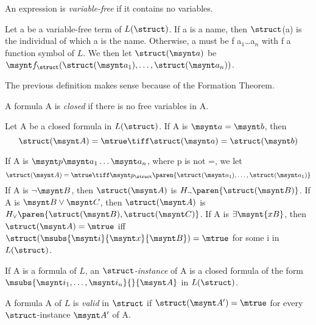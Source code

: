 \begin{definition}
	An expression is \emph{variable-free} if it contains no variables.
\end{definition}

\begin{definition}
	Let \synt a be a variable-free term of $L(\struct)$. If \synt a is a name, then
	$\struct$(\synt a) is the individual of which \synt a is the name. Otherwise,
	\synt a must be \synt f \synt a$_1$\dots\synt a$_n$ with \synt f a function
	symbol of $L$. We then let $\struct(\msynt a)$ be 
	$\msynt f_\struct(\struct(\msynt a_1), \dots, \struct(\msynt a_n))$.
\end{definition}

\begin{remark}
	The previous definition makes sense because of the Formation Theorem.
\end{remark}

\begin{definition}
	A formula \synt A is \emph{closed} if there is no free variables in \synt A.
\end{definition}

\begin{definition}
	Let \synt A be a closed formula in $L(\struct)$. If \synt A is $\msynt a = \msynt b$,
	then \[\struct(\msynt A) = \mtrue \tiff \struct(\msynt a)=\struct(\msynt b)\]

	If \synt A is $\msynt p \msynt a_1 \dots \msynt a_n$, where \synt p is not =,
	we let 
	\[\struct(\msynt A) = \mtrue \tiff \msynt p_\struct\paren{\struct(\msynt a_1),\dots,\struct(\msynt a_1)}\]
	If \synt A is $\lnot \msynt B$, then $\struct(\msynt  A)$ is
	$H_\lnot\paren{\struct(\msynt B)}$. If \synt A is $\msynt B \lor \msynt C$, then
	$\struct(\msynt  A)$ is $H_\lor\paren{\struct(\msynt B),\struct(\msynt C)}$.
	If \synt A is $\exists \msynt{xB}$, then $\struct(\msynt A) = \mtrue$ iff 
	$\struct(\msubs{\msynt i}{\msynt x}{\msynt B})=\mtrue$ for some \synt i in
	$L(\struct)$.
\end{definition}

\begin{definition}
	If \synt A is a formula of $L$, an \emph{$\struct$-instance} of \synt A
	is a closed formula of the form
	$\msubs{\msynt i_1,\dots,\msynt i_n}{}{\msynt A}$ in $L(\struct)$.
\end{definition}

\begin{definition}
	A formula \synt A of $L$ is \emph{valid} in $\struct$ if $\struct(\msynt A')=\mtrue$
	for every $\struct$-instance $\msynt A'$ of \synt A.
\end{definition}

